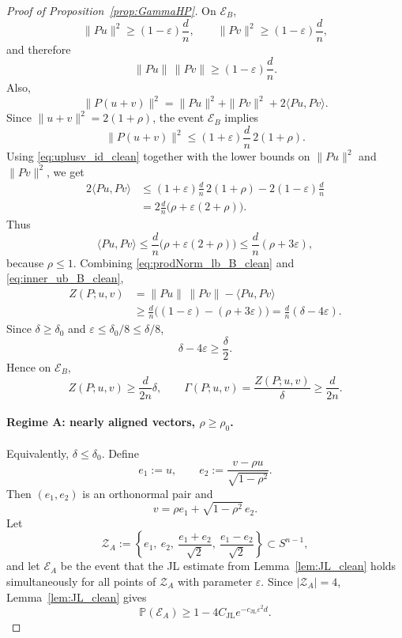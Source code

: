 \documentclass{article}
\begin{document}
\begin{proof}[Proof of Proposition~\ref{prop:GammaHP}]
On \(\mathcal E_B\),
\[
\|Pu\|^2\ge (1-\varepsilon)\frac dn,
\qquad
\|Pv\|^2\ge (1-\varepsilon)\frac dn,
\]
and therefore
\begin{equation}
\|Pu\|\,\|Pv\|
\ge
(1-\varepsilon)\frac dn.
\label{eq:prodNorm_lb_B_clean}
\end{equation}
Also,
\begin{equation}
\|P(u+v)\|^2
=
\|Pu\|^2+\|Pv\|^2+2\langle Pu,Pv\rangle.
\label{eq:uplusv_id_clean}
\end{equation}
Since \(\|u+v\|^2=2(1+\rho)\), the event \(\mathcal E_B\) implies
\[
\|P(u+v)\|^2
\le
(1+\varepsilon)\frac dn\,2(1+\rho).
\]
Using \eqref{eq:uplusv_id_clean} together with the lower bounds on
\(\|Pu\|^2\) and \(\|Pv\|^2\), we get
\begin{align}
2\langle Pu,Pv\rangle
&\le
(1+\varepsilon)\frac dn\,2(1+\rho)
-
2(1-\varepsilon)\frac dn \nonumber\\
&=
2\frac dn\bigl(\rho+\varepsilon(2+\rho)\bigr).
\label{eq:inner_ub_pre_B_clean}
\end{align}
Thus
\begin{equation}
\langle Pu,Pv\rangle
\le
\frac dn\bigl(\rho+\varepsilon(2+\rho)\bigr)
\le
\frac dn(\rho+3\varepsilon),
\label{eq:inner_ub_B_clean}
\end{equation}
because \(\rho\le1\). Combining \eqref{eq:prodNorm_lb_B_clean} and
\eqref{eq:inner_ub_B_clean},
\begin{align}
Z(P;u,v)
&=
\|Pu\|\,\|Pv\|-\langle Pu,Pv\rangle \nonumber\\
&\ge
\frac dn\bigl((1-\varepsilon)-(\rho+3\varepsilon)\bigr)
=
\frac dn(\delta-4\varepsilon).
\label{eq:Zlb_B_clean}
\end{align}
Since \(\delta\ge\delta_0\) and
\(\varepsilon\le\delta_0/8\le\delta/8\),
\[
\delta-4\varepsilon\ge \frac{\delta}{2}.
\]
Hence on \(\mathcal E_B\),
\begin{equation}
Z(P;u,v)\ge \frac{d}{2n}\delta,
\qquad
\Gamma(P;u,v)=\frac{Z(P;u,v)}{\delta}\ge \frac{d}{2n}.
\label{eq:regimeB_hp_clean}
\end{equation}

\paragraph{Regime A: nearly aligned vectors, \(\rho\ge \rho_0\).}
Equivalently, \(\delta\le\delta_0\). Define
\[
e_1:=u,
\qquad
e_2:=\frac{v-\rho u}{\sqrt{1-\rho^2}}.
\]
Then \((e_1,e_2)\) is an orthonormal pair and
\[
v=\rho e_1+\sqrt{1-\rho^2}\,e_2.
\]
Let
\[
\mathcal Z_A
:=
\left\{
e_1,\ e_2,\ \frac{e_1+e_2}{\sqrt2},\
\frac{e_1-e_2}{\sqrt2}
\right\}\subset S^{n-1},
\]
and let \(\mathcal E_A\) be the event that the JL estimate from
Lemma~\ref{lem:JL_clean} holds simultaneously for all points of
\(\mathcal Z_A\) with parameter \(\varepsilon\). Since
\(|\mathcal Z_A|=4\), Lemma~\ref{lem:JL_clean} gives
\begin{equation}
\mathbb P(\mathcal E_A)
\ge
1-4C_{\mathrm{JL}}e^{-c_{\mathrm{JL}}\varepsilon^2d}.
\label{eq:PA_clean}
\end{equation}


\end{proof}
\end{document}
